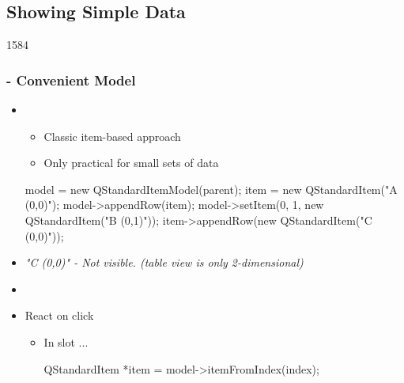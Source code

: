 %
%
%
%

\subsection{Showing Simple Data}


\begin{slide}[fragile]{1584}\frametitle{ -
    Convenient Model}
  \begin{itemize}
  \item {}
    \begin{itemize}
   \item Classic item-based approach
    \item Only practical for small sets of data
 \end{itemize}
   \begin{cpp}
model = new QStandardItemModel(parent);
item = new QStandardItem("A (0,0)");
model->appendRow(item);
model->setItem(0, 1, new QStandardItem("B (0,1)"));
item->appendRow(new QStandardItem("C (0,0)"));
\end{cpp}
\item \textit{"C (0,0)" - Not visible. (table view is only 2-dimensional)}
\item[]
\item React on click
  \begin{itemize}
  \begin{cpp}
connect(m_view, SIGNAL(clicked(QModelIndex)) ...
  \end{cpp}
 \item In slot ...
  \begin{cpp}
QStandardItem *item = model->itemFromIndex(index);    
  \end{cpp}
 \end{itemize}
\end{itemize}
\end{slide}

